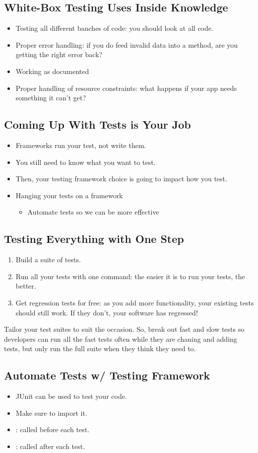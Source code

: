 \documentclass[letterpaper]{article}
\begin{document}
\subsection{White-Box Testing Uses Inside Knowledge}
\begin{itemize}
    \item Testing all different banches of code: you should look at all code. 
    \item Proper error handling: if you do feed invalid data into a method, are you getting the right error back? 
    \item Working as documented 
    \item Proper handling of resource constraints: what happens if your app needs something it can't get? 
\end{itemize}

\subsection{Coming Up With Tests is Your Job}
\begin{itemize}
    \item Frameworks run your test, not write them. 
    \item You still need to know what you want to test. 
    \item Then, your testing framework choice is going to impact how you test. 
    \item Hanging your tests on a framework 
    \begin{itemize}
        \item Automate tests so we can be more effective
    \end{itemize}
\end{itemize}

\subsection{Testing Everything with One Step}
\begin{enumerate}
    \item Build a suite of tests. 
    \item Run all your tests with one command: the easier it is to run your tests, the better. 
    \item Get regression tests for free: as you add more functionality, your existing tests should still work. If they don't, your software has regressed! 
\end{enumerate}

Tailor your test suites to suit the occasion. So, break out fast and slow tests so developers can run all the fast tests often while they are chaning and adding tests, but only run the full suite when they think they need to. 

\subsection{Automate Tests w/ Testing Framework}
\begin{itemize}
    \item JUnit can be used to test your code. 
    \item Make sure to import it. 
    \item {}: called before each test. 
    \item {}: called after each test. 
\end{itemize}
\end{document}
